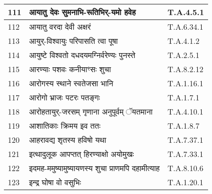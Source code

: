 \documentclass[17pt]{extarticle}
\begin{document}
\begin{longtable}{||p{0.4in}||p{4.9in}||p{0.9in}||}
    \hline
        
    111 & आयातु देवः सुमनाभि{-}रूतिभिर्{-}यमो हवेह & T.A.4.5.1       \\
    
    \hline
        
    112 & आयातु वरदा देवी अक्षरं & T.A.6.34.1       \\
    
    \hline
        
    113 & आयुर्{-}विश्वायुः परिपासति त्वा पूषा & T.A.4.1.2       \\
    
    \hline
        
    114 & आयुष्टे विश्वतो दधदयमग्निर्वरेण्यः पुनस्ते & T.A.2.5.1       \\
    
    \hline
        
    115 & आरण्याः पशवः कनीयाꣳसः शुचा & T.A.8.2.12       \\
    
    \hline
        
    116 & आरोगस्य स्थाने स्वतेजसा भानि & T.A.1.16.1       \\
    
    \hline
        
    117 & आरोगो भ्राजः पटरः पतङ्गः & T.A.1.7.1       \\
    
    \hline
        
    118 & आरोहतायुर्{-}जरसम् गृणाना अनुपूर्वम् ॅयतमाना & T.A.4.10.1       \\
    
    \hline
        
    119 & आशातिकाः क्रिमय इव ततः & T.A.1.8.7       \\
    
    \hline
        
    120 & आहरावद्य शृतस्य हविषो यथा & T.A.7.37.1       \\
    
    \hline
        
    121 & इत्थादुलूक आपप्तत् हिरण्याक्षो अयोमुखः & T.A.7.33.1       \\
    
    \hline
        
    122 & इदमह{-}ममुष्यामुष्यायणस्य शुचा प्राणमपि दहामीत्याह & T.A.8.10.6       \\
    
    \hline
        
    123 & इन्द्र घोषा वो वसुभिः & T.A.1.20.1       \\
    

\end{longtable}
\end{document}
